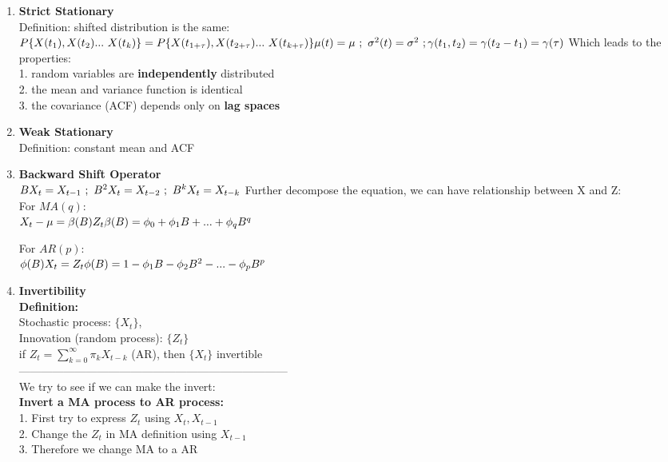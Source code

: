 \documentclass[10pt,landscape]{article}
\begin{document}
\begin{multicols}{3}
\begin{enumerate}
  \item \textbf{Strict Stationary}\\
		Definition: shifted distribution is the same:\\
		$
		P\{X(t_1), X(t_2) ...\ X(t_k)\} = P\{X(t_{1+\tau}), X(t_{2+\tau}) ...\ X(t_{k+\tau})\}\newline
		\mu(t) = \mu \ ; \ \sigma^2(t) = \sigma^2 \ ; \gamma(t_1,t_2) = \gamma(t_2-t_1) = \gamma(\tau)
		$
		Which leads to the properties:\\
		1. random variables are \textbf{independently} distributed\\
		2. the mean and variance function is identical\\
		3. the covariance (ACF) depends only on \textbf{lag spaces}
  \item \textbf{Weak Stationary}\\
  		Definition: constant mean and ACF
  \item \textbf{Backward Shift Operator}\\
  		$
  		BX_t = X_{t-1} \ ; \ B^2X_t = X_{t-2} \ ; \ B^kX_t = X_{t-k}\\
  		$
  		Further decompose the equation, we can have relationship between X and Z:\\
  		For $MA(q)$:\\
  		$
  		X_t - \mu = \beta(B)Z_t\\
  		\beta(B) = \phi_0 + \phi_1B+ ... + \phi_qB^q
  		$
  		
  		For $AR(p)$:\\
  		$
  		\phi(B)X_t = Z_t\\
  		\phi(B) = 1-\phi_1B - \phi_2B^2 - ... - \phi_pB^p
  		$
  		
  \item \textbf{Invertibility}\\
  		\textbf{Definition:}\\
  		Stochastic process: $\{X_t\}$, \\
  		Innovation (random process): $\{Z_t\}$\\
  		if $Z_t = \sum_{k=0}^{\infty} \pi_kX_{t-k}$ (AR), then $\{X_t\}$ invertible\\
  		------------------------------------------------------------------------\\
  		We try to see if we can make the invert:\\
  		\textbf{Invert a MA process to AR process:}\\
  		1. First try to express $Z_t$ using $X_t, X_{t-1}$\\
  		2. Change the $Z_t$ in MA definition using $X_{t-1}$\\
  		3. Therefore we change MA to a AR
  		

\end{enumerate}
\end{multicols}
\end{document}
